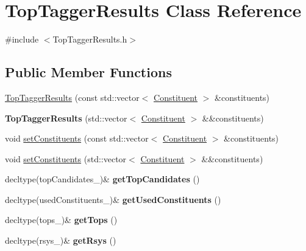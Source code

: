 \hypertarget{classTopTaggerResults}{\section{Top\-Tagger\-Results Class Reference}
\label{classTopTaggerResults}
}


{\ttfamily \#include $<$Top\-Tagger\-Results.\-h$>$}

\subsection*{Public Member Functions}
\begin{DoxyCompactItemize}
\item 
\hyperlink{classTopTaggerResults_a661fa9c839fd16be88ea1205cf274c7e}{Top\-Tagger\-Results} (const std\-::vector$<$ \hyperlink{classConstituent}{Constituent} $>$ \&constituents)
\item 
\hypertarget{classTopTaggerResults_a2a91300ec5ed751c36b2d06202349bad}{{\bfseries Top\-Tagger\-Results} (std\-::vector$<$ \hyperlink{classConstituent}{Constituent} $>$ \&\&constituents)}\label{classTopTaggerResults_a2a91300ec5ed751c36b2d06202349bad}

\item 
void \hyperlink{classTopTaggerResults_a2d7cf77c1e4591e6fbdf0b297a3f87bd}{set\-Constituents} (const std\-::vector$<$ \hyperlink{classConstituent}{Constituent} $>$ \&constituents)
\item 
void \hyperlink{classTopTaggerResults_a4ab733379f6e450ce98b2afdb4f6e523}{set\-Constituents} (std\-::vector$<$ \hyperlink{classConstituent}{Constituent} $>$ \&\&constituents)
\item 
\hypertarget{classTopTaggerResults_a36f6d9d5d0de2835f9d2eb904c937ba1}{decltype(top\-Candidates\-\_\-)\& {\bfseries get\-Top\-Candidates} ()}\label{classTopTaggerResults_a36f6d9d5d0de2835f9d2eb904c937ba1}

\item 
\hypertarget{classTopTaggerResults_a4a8dbb53762a071549d79297a4368881}{decltype(used\-Constituents\-\_\-)\& {\bfseries get\-Used\-Constituents} ()}\label{classTopTaggerResults_a4a8dbb53762a071549d79297a4368881}

\item 
\hypertarget{classTopTaggerResults_ac05c9403224d1146581d69486b1a3a29}{decltype(tops\-\_\-)\& {\bfseries get\-Tops} ()}\label{classTopTaggerResults_ac05c9403224d1146581d69486b1a3a29}

\item 
\hypertarget{classTopTaggerResults_a4fc99173e33deb2efc0f5d79f05d8c8b}{decltype(rsys\-\_\-)\& {\bfseries get\-Rsys} ()}\label{classTopTaggerResults_a4fc99173e33deb2efc0f5d79f05d8c8b}


\end{DoxyCompactItemize}
